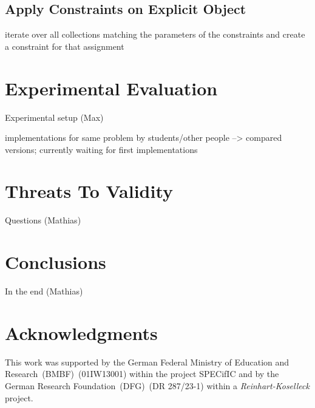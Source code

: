 \documentclass[conference]{IEEEtran}
\begin{document}
\subsection{Apply Constraints on Explicit Object}
\label{sec:impl_applying}

\danger iterate over all collections matching the parameters of the constraints
and create a constraint for that assignment

\section{Experimental Evaluation}
\label{sec:exper-eval}

\danger Experimental setup (Max)

\danger implementations for same problem by students/other people --> compared
versions; currently waiting for first implementations

\section{Threats To Validity}
\label{sec:threats-validity}

\danger Questions (Mathias)

\section{Conclusions}
\label{sec:conclusions}

\danger In the end (Mathias)

\section*{Acknowledgments}
\label{sec:acknowledgments}
This work was supported by the German Federal Ministry of Education and
Research~(BMBF)~(01IW13001) within the project SPECifIC and by the German
Research Foundation~(DFG)~(DR 287/23-1) within a \emph{Reinhart-Koselleck}
project.




\end{document}
